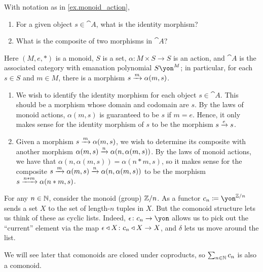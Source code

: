 \documentclass[Book-Poly]{subfiles}
\begin{document}
\begin{exercise}
With notation as in \cref{ex.monoid_action},
\begin{enumerate}
    \item For a given object $s \in \cat{A}$, what is the identity morphism?
    \item What is the composite of two morphisms in $\cat{A}$?
\qedhere
\end{enumerate}
\begin{solution}
Here $(M,e,*)$ is a monoid, $S$ is a set, $\alpha \colon M \times S \to S$ is an action, and $\cat{A}$ is the associated category with emanation polynomial $S\yon^M$; in particular, for each $s \in S$ and $m \in M$, there is a morphism $s \xrightarrow{m} \alpha(m,s)$.
\begin{enumerate}
    \item We wish to identify the identity morphism for each object $s \in \cat{A}$.
    This should be a morphism whose domain and codomain are $s$.
    By the laws of monoid actions, $\alpha(m,s)$ is guaranteed to be $s$ if $m = e$.
    Hence, it only makes sense for the identity morphism of $s$ to be the morphism $s \xrightarrow{e} s$.
    \item Given a morphism $s \xrightarrow{m} \alpha(m,s)$, we wish to determine its composite with another morphism $\alpha(m,s) \xrightarrow{n} \alpha(n,\alpha(m,s))$.
    By the laws of monoid actions, we have that $\alpha(n,\alpha(m,s)) = \alpha(n*m,s)$, so it makes sense for the composite $s \xrightarrow{m} \alpha(m,s) \xrightarrow{n} \alpha(n,\alpha(m,s))$ to be the morphism $s \xrightarrow{n*m} \alpha(n*m,s)$.
\end{enumerate}
\end{solution}
\end{exercise}



\begin{example}
For any $n\in\mathbb{N}$, consider the monoid (group) $\mathbb{Z}/n$. As a functor $c_n\coloneqq\yon^{\zz/n}$ sends a set $X$ to the set of length-$n$ tuples in $X$. But the comonoid structure lets us think of these as cyclic lists. Indeed, $\epsilon\colon c_n\to\yon$ allows us to pick out the ``current'' element via the map $\epsilon\mathbin{\triangleleft} X\colon c_n\mathbin{\triangleleft} X\to X$, and $\delta$ lets us move around the list.

We will see later that comonoids are closed under coproducts, so $\sum_{n\in\mathbb{N}}c_n$ is also a comonoid.
\end{example}
\end{document}
